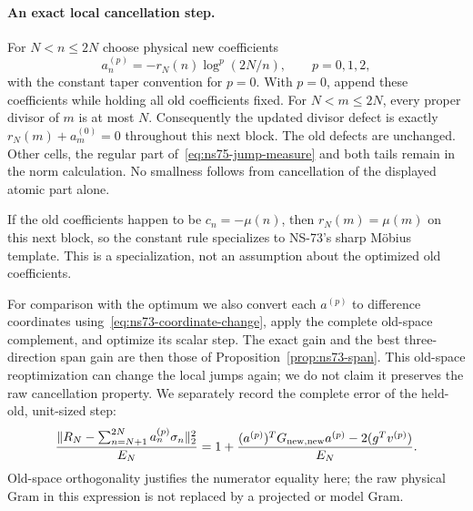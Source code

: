 \paragraph{An exact local cancellation step.}
For $N<n\leq2N$ choose physical new coefficients
\[
 a_n^{(p)}=-r_N(n)\log^p(2N/n),\qquad p=0,1,2,
\]
with the constant taper convention for $p=0$.
With $p=0$, append these coefficients while holding all old coefficients
fixed. For $N<m\leq2N$, every proper divisor of $m$ is at most $N$.
Consequently the updated divisor defect is exactly
$r_N(m)+a_m^{(0)}=0$ throughout this next block. The old defects are
unchanged. Other cells, the regular part of~\eqref{eq:ns75-jump-measure}
and both tails remain in the norm calculation. No smallness follows
from cancellation of the displayed atomic part alone.

If the old coefficients happen to be $c_n=-\mu(n)$, then
$r_N(m)=\mu(m)$ on this next block, so the constant rule specializes
to NS-73's sharp M\"obius template. This is a specialization, not an
assumption about the optimized old coefficients.

For comparison with the optimum we also convert each $a^{(p)}$ to
difference coordinates using~\eqref{eq:ns73-coordinate-change}, apply
the complete old-space complement, and optimize its scalar step.
The exact gain and the best three-direction span gain are then those
of Proposition~\ref{prop:ns73-span}. This old-space reoptimization
can change the local jumps again; we do not claim it preserves the
raw cancellation property. We separately record the complete error
of the held-old, unit-sized step:
\[
 \frac{\|R_N-\sum_{n=N+1}^{2N}a_n^{(p)}\sigma_n\|_2^2}{E_N}
 =1+\frac{(a^{(p)})^TG_{\rm new,new}a^{(p)}
                 -2(g^Tv^{(p)})}{E_N}.
\]
Old-space orthogonality justifies the numerator equality here;
the raw physical Gram in this expression is not replaced by a
projected or model Gram.

